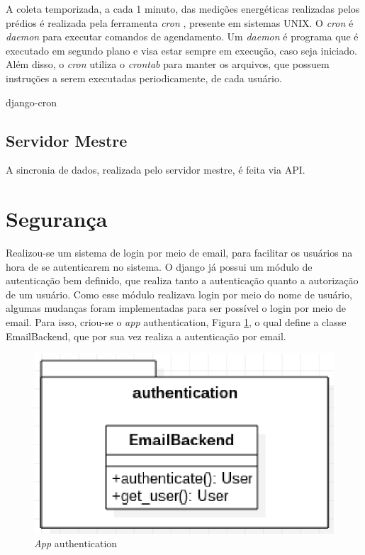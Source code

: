 A coleta temporizada, a cada 1 minuto, das medições energéticas realizadas pelos prédios é realizada pela ferramenta \textit{cron} \cite{paul_cron}, presente em sistemas UNIX. O \textit{cron} é \textit{daemon} para executar comandos de agendamento. Um \textit{daemon} é programa que é executado em segundo plano e visa estar sempre em execução, caso seja iniciado. Além disso, o \textit{cron} utiliza o \textit{crontab} para manter os arquivos, que possuem instruções a serem executadas periodicamente, de cada usuário.

django-cron

\subsection{Servidor Mestre}
A sincronia de dados, realizada pelo servidor mestre, é feita via API.

\section{Segurança}
Realizou-se um sistema de login por meio de email, para facilitar os usuários na hora de se autenticarem no sistema. O django já possui um módulo de autenticação bem definido, que realiza tanto a autenticação quanto a autorização de um usuário. Como esse módulo realizava login por meio do nome de usuário, algumas mudanças foram implementadas para ser possível o login por meio de email. Para isso, criou-se o \textit{app} authentication, Figura \ref{authentication}, o qual define a classe EmailBackend, que por sua vez realiza a autenticação por email.

\begin{figure}[!h]
    \centering
    \includegraphics[keepaspectratio=true,scale=0.8]{figuras/authentication.eps}
    \caption{\textit{App} authentication}
    \label{authentication}
\end{figure}

